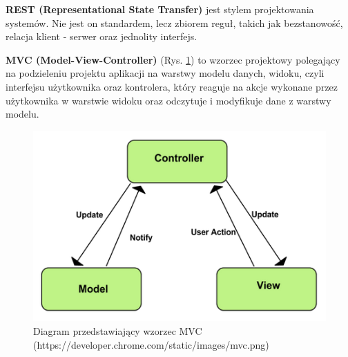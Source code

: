 \textbf{REST (Representational State Transfer)} jest stylem projektowania systemów. Nie jest on standardem, lecz zbiorem reguł, takich jak bezstanowość, relacja klient - serwer oraz jednolity interfejs.\cite{rest}

\textbf{MVC (Model-View-Controller)} (Rys. \ref{mvc}) to wzorzec projektowy polegający na podzieleniu projektu aplikacji na warstwy modelu danych, widoku, czyli interfejsu użytkownika oraz kontrolera, który reaguje na akcje wykonane przez użytkownika w warstwie widoku oraz odczytuje i modyfikuje dane z warstwy modelu.\cite{mvc}
\begin{figure}[!ht]
	\begin{center}
		\includegraphics[width=5in]{img/diagram/mvc.png}
		\caption{Diagram przedstawiający wzorzec MVC (https://developer.chrome.com/static/images/mvc.png)}
		\label{mvc}
	\end{center}
\end{figure}

